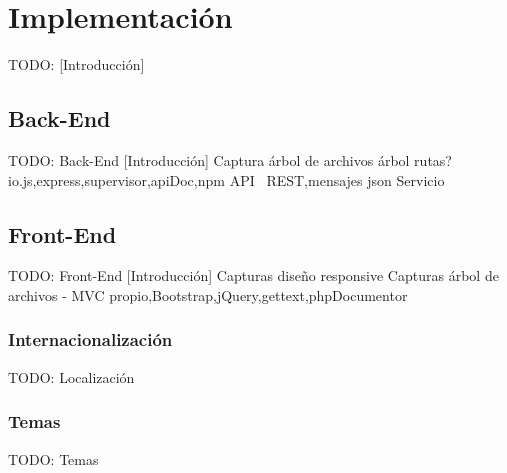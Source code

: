 \chapter{Implementación\label{cap:implementacion}}

TODO: [Introducción]


\section{Back-End\label{sec:imp:back_end}}

TODO: Back-End
  [Introducción]
  Captura árbol de archivos
  árbol rutas?
  {io.js,express,supervisor,apiDoc,npm}
  {API ~REST,mensajes json}
  {Servicio}


\section{Front-End\label{sec:imp:front_end}}

TODO: Front-End
  [Introducción]
  Capturas diseño responsive
  Capturas árbol de archivos
  - {MVC propio,Bootstrap,jQuery,gettext,phpDocumentor}


\subsection{Internacionalización\label{ssec:imp:internacionalizacion}}

TODO: Localización


\subsection{Temas\label{ssec:imp:temas}}

TODO: Temas